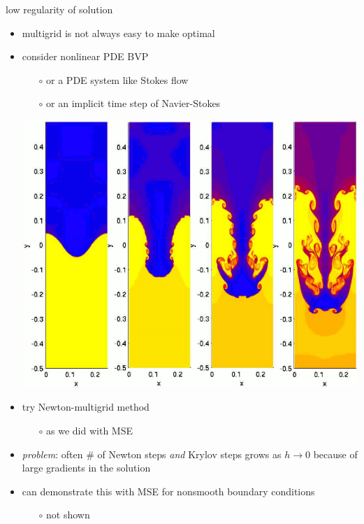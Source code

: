 \documentclass[hide notes,intlimits,usenames,dvipsnames]{beamer}
\begin{document}
\begin{frame}{low regularity of solution}
\begin{itemize}
\item multigrid is not always easy to make optimal
\item 
\begin{minipage}[t]{60mm}
consider nonlinear PDE BVP
    \begin{itemize}
    \item[$\circ$] or a PDE system like Stokes flow
    \item[$\circ$] or an implicit time step of Navier-Stokes
    \end{itemize}
\end{minipage} \quad
\begin{minipage}[t]{35mm}
\vspace{0mm}
\includegraphics[width=1.1\textwidth]{figs/rayleigh-taylor-instability}
\end{minipage}

\vspace{-3mm}
\item try Newton-multigrid method
    \begin{itemize}
    \item[$\circ$] as we did with MSE
    \end{itemize}
\item \emph{problem}:  often \# of Newton steps \emph{and} Krylov steps grows as $h\to 0$ because of large gradients in the solution
\item \begin{minipage}[t]{75mm}
can demonstrate this with MSE for nonsmooth boundary conditions
    \vspace{-2mm}
    \begin{itemize}
    \item[$\circ$] not shown
    

\end{itemize}
\end{minipage}
\end{itemize}
\end{frame}
\end{document}
